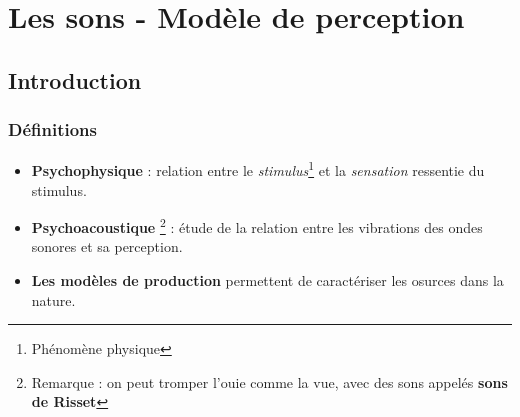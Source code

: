 \chapter{Les sons - Modèle de perception}
\section{Introduction}
\subsection{Définitions}
\begin{itemize}
    \item \textbf{Psychophysique} : relation entre le \textit{stimulus}\footnote{Phénomène physique} et la \textit{sensation} ressentie du stimulus. \newline
    \item \textbf{Psychoacoustique} \footnote{Remarque : on peut tromper l'ouie comme la vue, avec des sons appelés \textbf{sons de Risset}} : étude de la relation entre les vibrations des ondes sonores et sa perception.\newline
    \item \textbf{Les modèles de production} permettent de caractériser les osurces dans la nature.
\end{itemize}
